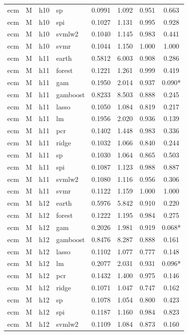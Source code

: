 \begin{ThreePartTable}
\begin{longtable}[t]{llclcccc}
ecm & M & h10 & sp & 0.0991 & 1.092 & 0.951 & 0.663\\
ecm & M & h10 & spi & 0.1027 & 1.131 & 0.995 & 0.928\\
ecm & M & h10 & svmlw2 & 0.1040 & 1.145 & 0.983 & 0.441\\
ecm & M & h10 & svmr & 0.1044 & 1.150 & 1.000 & 1.000\\
\addlinespace
ecm & M & h11 & earth & 0.5812 & 6.003 & 0.908 & 0.286\\
ecm & M & h11 & forest & 0.1221 & 1.261 & 0.999 & 0.419\\
ecm & M & h11 & gam & 0.1950 & 2.014 & 0.937 & 0.090*\\
ecm & M & h11 & gamboost & 0.8233 & 8.503 & 0.888 & 0.245\\
ecm & M & h11 & lasso & 0.1050 & 1.084 & 0.819 & 0.217\\
ecm & M & h11 & lm & 0.1956 & 2.020 & 0.936 & 0.139\\
ecm & M & h11 & pcr & 0.1402 & 1.448 & 0.983 & 0.336\\
ecm & M & h11 & ridge & 0.1032 & 1.066 & 0.840 & 0.244\\
ecm & M & h11 & sp & 0.1030 & 1.064 & 0.865 & 0.503\\
ecm & M & h11 & spi & 0.1087 & 1.123 & 0.988 & 0.887\\
ecm & M & h11 & svmlw2 & 0.1080 & 1.116 & 0.956 & 0.306\\
ecm & M & h11 & svmr & 0.1122 & 1.159 & 1.000 & 1.000\\
\addlinespace
ecm & M & h12 & earth & 0.5976 & 5.842 & 0.910 & 0.220\\
ecm & M & h12 & forest & 0.1222 & 1.195 & 0.984 & 0.275\\
ecm & M & h12 & gam & 0.2026 & 1.981 & 0.919 & 0.068*\\
ecm & M & h12 & gamboost & 0.8476 & 8.287 & 0.888 & 0.161\\
ecm & M & h12 & lasso & 0.1102 & 1.077 & 0.777 & 0.148\\
ecm & M & h12 & lm & 0.2077 & 2.031 & 0.931 & 0.096*\\
ecm & M & h12 & pcr & 0.1432 & 1.400 & 0.975 & 0.146\\
ecm & M & h12 & ridge & 0.1071 & 1.047 & 0.747 & 0.162\\
ecm & M & h12 & sp & 0.1078 & 1.054 & 0.800 & 0.423\\
ecm & M & h12 & spi & 0.1187 & 1.160 & 0.984 & 0.823\\
ecm & M & h12 & svmlw2 & 0.1109 & 1.084 & 0.873 & 0.160\\

\end{longtable}
\end{ThreePartTable}
